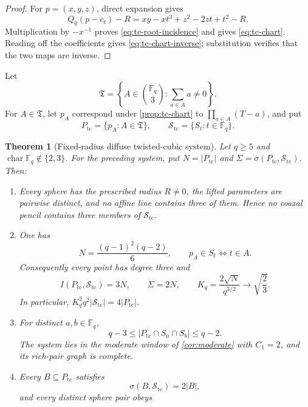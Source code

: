 \documentclass[11pt,letterpaper]{amsart}
\newtheorem{theorem}{Theorem}[section]
\theoremstyle{definition}
\theoremstyle{remark}
\newcommand{\1}{\mathbf 1}
\begin{document}
\begin{proof}
For $p=(x,y,z)$, direct expansion gives
\[
 Q_0(p-c_t)-R=xy-xt^3+z^2-2zt+t^2-R.
\]
Multiplication by $-x^{-1}$ proves \eqref{eq:tc-root-incidence} and gives \eqref{eq:tc-chart}.  Reading off the coefficients gives \eqref{eq:tc-chart-inverse}; substitution verifies that the two maps are inverse.
\end{proof}

Let
\[
 \mathfrak T=\left\{A\in\binom{\mathbb F_q}{3}:\sum_{a\in A}a\ne0\right\}.
\]
For $A\in\mathfrak T$, let $p_A$ correspond under \cref{prop:tc-chart} to $\prod_{a\in A}(T-a)$, and put
\[
 P_{\mathrm{tc}}=\{p_A:A\in\mathfrak T\},
 \qquad
 \mathcal S_{\mathrm{tc}}=\{S_t:t\in\mathbb F_q\}.
\]

\begin{theorem}[Fixed-radius diffuse twisted-cubic system]\label{thm:fixed-tc}
Let $q\ge5$ and $\operatorname{char}\mathbb F_q\notin\{2,3\}$.  For the preceding system, put $N=|P_{\mathrm{tc}}|$ and $\Sigma=\sigma(P_{\mathrm{tc}},\mathcal S_{\mathrm{tc}})$.  Then:
\begin{enumerate}[label=\textup{(\arabic*)}]
\item Every sphere has the prescribed radius $R\ne0$, the lifted parameters are pairwise distinct, and no affine line contains three of them.  Hence no coaxal pencil contains three members of $\mathcal S_{\mathrm{tc}}$.
\item One has
\begin{equation}\label{eq:tc-N}
 N=\frac{(q-1)^2(q-2)}6,
 \qquad
 p_A\in S_t\Longleftrightarrow t\in A.
\end{equation}
Consequently every point has degree three and
\begin{equation}\label{eq:tc-surplus}
 I(P_{\mathrm{tc}},\mathcal S_{\mathrm{tc}})=3N,
 \qquad
 \Sigma=2N,
 \qquad
 K_q=\frac{2\sqrt N}{q^{3/2}}\longrightarrow\sqrt{\frac23}.
\end{equation}
In particular, $K_q^2q^2|\mathcal S_{\mathrm{tc}}|=4|P_{\mathrm{tc}}|$.
\item For distinct $a,b\in\mathbb F_q$,
\begin{equation}\label{eq:tc-pairs}
 q-3\le|P_{\mathrm{tc}}\cap S_a\cap S_b|\le q-2.
\end{equation}
The system lies in the moderate window of \cref{cor:moderate} with $C_1=2$, and its rich-pair graph is complete.
\item Every $B\subseteq P_{\mathrm{tc}}$ satisfies
\[
 \sigma(B,\mathcal S_{\mathrm{tc}})=2|B|,
\]
and every distinct sphere pair obeys

\end{enumerate}
\end{theorem}
\end{document}
